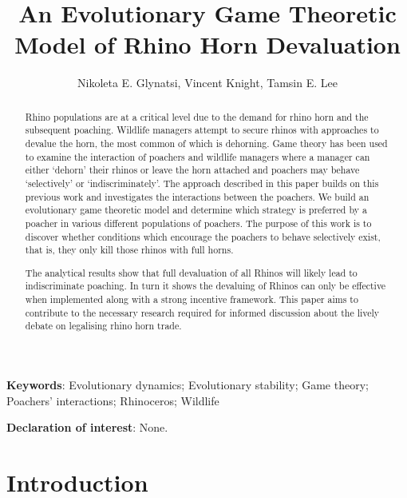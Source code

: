 \documentclass[10pt]{article}
\title{An Evolutionary Game Theoretic Model of Rhino Horn Devaluation}
\author{Nikoleta E. Glynatsi, Vincent Knight, Tamsin E. Lee} %
\date{}
\begin{document}
\maketitle

\bigskip
\textbf{Keywords}: Evolutionary dynamics; Evolutionary stability; Game theory; \\
\indent Poachers' interactions; Rhinoceros; Wildlife

\bigskip

\textbf{Declaration of interest}: None.

\newpage
\linenumbers{}
\begin{abstract}

Rhino populations are at a critical level due to the demand for rhino horn and
the subsequent poaching. Wildlife managers attempt to secure rhinos with
approaches to devalue the horn, the most common of which is dehorning. Game theory
has been used to examine the interaction of poachers and wildlife managers where
a manager can either `dehorn' their rhinos or leave the horn attached and poachers
may behave `selectively' or `indiscriminately'. The approach described in this paper
builds on this previous
work and investigates the interactions between the poachers. We build an evolutionary
game theoretic model and determine which strategy is preferred by a poacher in various
different populations of poachers. The purpose of this work is to discover whether
conditions which encourage the poachers to behave selectively exist, that is,
they only kill those rhinos with full horns.

The analytical
results show that full devaluation of all Rhinos will likely lead to
indiscriminate poaching. In turn it shows the devaluing of Rhinos can only be
effective when implemented along with a strong incentive framework.
This paper aims to
contribute to the necessary research required for informed discussion about the
lively debate on legalising rhino horn trade.

\end{abstract}

\section{Introduction}\label{section:introduction}
\end{document}
